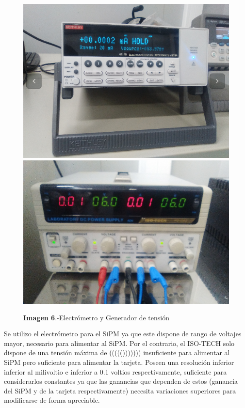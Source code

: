 \documentclass[11pt, a4paper]{article}
\begin{document}
\begin{itemize}
\begin{figure}[htb]
\centering
{
\includegraphics[scale=0.2]{KEITHLEY.png} 
}
{
\includegraphics[scale=0.2]{ISO-TECH.png} 
}
\caption{\textbf{Imagen 6}.-Electrómetro y Generador de tensión}
\end{figure} 

Se utilizo el electrómetro para el SiPM ya que este dispone de rango de voltajes mayor, necesario para alimentar al SiPM. Por el contrario, el ISO-TECH solo dispone de una tensión máxima de ((((())))))) insuficiente para alimentar al SiPM pero suficiente para alimentar la tarjeta. Poseen una resolución inferior inferior al milivoltio e inferior a 0.1 voltios respectivamente, suficiente para considerarlos constantes ya que las ganancias que dependen de estos (ganancia del SiPM y de la tarjeta respectivamente) necesita variaciones superiores para modificarse de forma apreciable.


\end{itemize}
\end{document}
